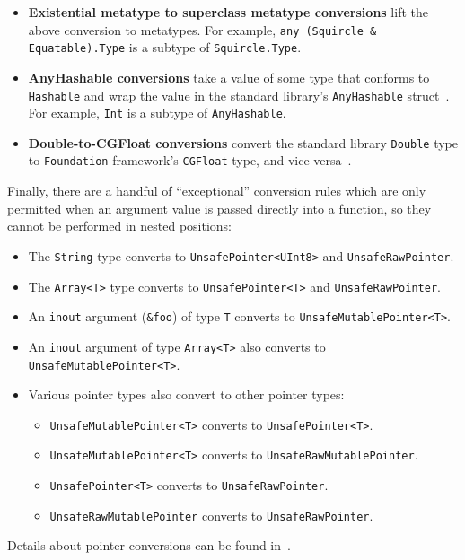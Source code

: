 \documentclass[../generics]{subfiles}
\begin{document}
\begin{itemize}
\item {}\textbf{Existential metatype to superclass metatype conversions} lift the above conversion to metatypes. For example, \verb|any (Squircle & Equatable).Type| is a subtype of \verb|Squircle.Type|.

\item \textbf{AnyHashable conversions} take a value of some type that conforms to \texttt{Hashable} and wrap the value in the standard library's \texttt{AnyHashable} struct~\cite{se0131}. For example, \texttt{Int} is a subtype of \texttt{AnyHashable}.

\item \textbf{Double-to-CGFloat conversions} convert the standard library \texttt{Double} type to \texttt{Foundation} framework's \texttt{CGFloat} type, and vice versa~\cite{se0307}.
\end{itemize}

Finally, there are a handful of ``exceptional'' conversion rules which are only permitted when an argument value is passed directly into a function, so they cannot be performed in nested positions:
\begin{itemize}
\item The \texttt{String} type converts to \texttt{UnsafePointer<UInt8>} and \texttt{UnsafeRawPointer}.
\item The \texttt{Array<T>} type converts to \texttt{UnsafePointer<T>} and \texttt{UnsafeRawPointer}.
\item An \texttt{inout} argument (\texttt{\&foo}) of type \texttt{T} converts to \texttt{UnsafeMutablePointer<T>}.
\item An \texttt{inout} argument of type \texttt{Array<T>} also converts to \texttt{UnsafeMutablePointer<T>}.
\item Various pointer types also convert to other pointer types:
\begin{itemize}
\item \verb|UnsafeMutablePointer<T>| converts to \verb|UnsafePointer<T>|.
\item \verb|UnsafeMutablePointer<T>| converts to \verb|UnsafeRawMutablePointer|.
\item \verb|UnsafePointer<T>| converts to \verb|UnsafeRawPointer|.
\item \verb|UnsafeRawMutablePointer| converts to \verb|UnsafeRawPointer|.
\end{itemize}
\end{itemize}
Details about pointer conversions can be found in~\cite{unsafepointer}.
\end{document}
